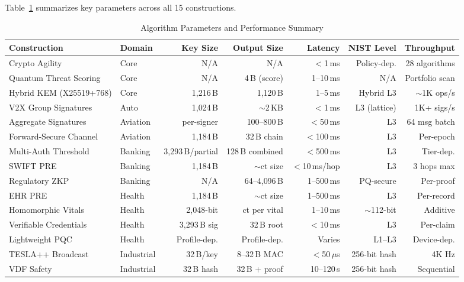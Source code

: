 \documentclass[conference,10pt]{IEEEtran}
\begin{document}
Table~\ref{tab:params} summarizes key parameters across all 15 constructions.

\begin{table}[t]
\centering
\caption{Algorithm Parameters and Performance Summary}
\label{tab:params}
\begin{tabular}{llrrrrr}
\toprule
\textbf{Construction} & \textbf{Domain} & \textbf{Key Size} & \textbf{Output Size} & \textbf{Latency} & \textbf{NIST Level} & \textbf{Throughput} \\
\midrule
Crypto Agility & Core & N/A & N/A & $<$1\,ms & Policy-dep. & 28 algorithms \\
Quantum Threat Scoring & Core & N/A & 4\,B (score) & 1--10\,ms & N/A & Portfolio scan \\
Hybrid KEM (X25519+768) & Core & 1{,}216\,B & 1{,}120\,B & 1--5\,ms & Hybrid L3 & $\sim$1K ops/s \\
V2X Group Signatures & Auto & 1{,}024\,B & $\sim$2\,KB & $<$1\,ms & L3 (lattice) & 1K+ sigs/s \\
Aggregate Signatures & Aviation & per-signer & 100--800\,B & $<$50\,ms & L3 & 64 msg batch \\
Forward-Secure Channel & Aviation & 1{,}184\,B & 32\,B chain & $<$100\,ms & L3 & Per-epoch \\
Multi-Auth Threshold & Banking & 3{,}293\,B/partial & 128\,B combined & $<$500\,ms & L3 & Tier-dep. \\
SWIFT PRE & Banking & 1{,}184\,B & $\sim$ct size & $<$10\,ms/hop & L3 & 3 hops max \\
Regulatory ZKP & Banking & N/A & 64--4{,}096\,B & 1--500\,ms & PQ-secure & Per-proof \\
EHR PRE & Health & 1{,}184\,B & $\sim$ct size & 1--500\,ms & L3 & Per-record \\
Homomorphic Vitals & Health & 2{,}048-bit & ct per vital & 1--10\,ms & $\sim$112-bit & Additive \\
Verifiable Credentials & Health & 3{,}293\,B sig & 32\,B root & $<$10\,ms & L3 & Per-claim \\
Lightweight PQC & Health & Profile-dep. & Profile-dep. & Varies & L1--L3 & Device-dep. \\
TESLA++ Broadcast & Industrial & 32\,B/key & 8--32\,B MAC & $<$50\,$\mu$s & 256-bit hash & 4K Hz \\
VDF Safety & Industrial & 32\,B hash & 32\,B + proof & 10--120\,s & 256-bit hash & Sequential \\
\bottomrule
\end{tabular}
\end{table}
\end{document}
